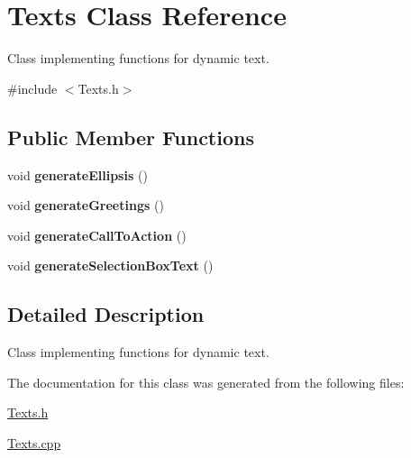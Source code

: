 \hypertarget{classTexts}{}\section{Texts Class Reference}
\label{classTexts}


Class implementing functions for dynamic text.  




{\ttfamily \#include $<$Texts.\+h$>$}

\subsection*{Public Member Functions}
\begin{DoxyCompactItemize}
\item 
\hypertarget{classTexts_a7a989502e54d479d655d7d0000a17e33}{}\label{classTexts_a7a989502e54d479d655d7d0000a17e33} 
void {\bfseries generate\+Ellipsis} ()
\item 
\hypertarget{classTexts_a04da412e532076fa8150de9c98b786bb}{}\label{classTexts_a04da412e532076fa8150de9c98b786bb} 
void {\bfseries generate\+Greetings} ()
\item 
\hypertarget{classTexts_af3c40cccfd5140714509152e037ae938}{}\label{classTexts_af3c40cccfd5140714509152e037ae938} 
void {\bfseries generate\+Call\+To\+Action} ()
\item 
\hypertarget{classTexts_ada4eb79f69811ee3de4e28c22a75be67}{}\label{classTexts_ada4eb79f69811ee3de4e28c22a75be67} 
void {\bfseries generate\+Selection\+Box\+Text} ()
\end{DoxyCompactItemize}


\subsection{Detailed Description}
Class implementing functions for dynamic text. 

The documentation for this class was generated from the following files\+:\begin{DoxyCompactItemize}
\item 
\hyperlink{Texts_8h}{Texts.\+h}\item 
\hyperlink{Texts_8cpp}{Texts.\+cpp}\end{DoxyCompactItemize}
